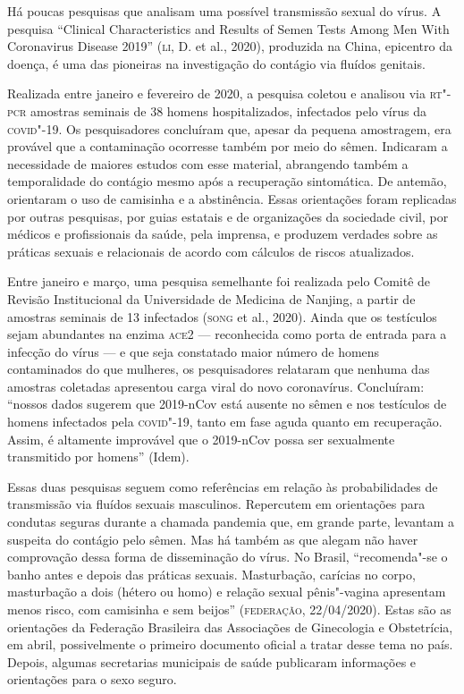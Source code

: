 Há poucas pesquisas que analisam uma possível transmissão sexual do
vírus. A pesquisa ``Clinical Characteristics and Results of Semen Tests
Among Men With Coronavirus Disease 2019'' (\textsc{li}, D. et al., 2020),
produzida na China, epicentro da doença, é uma das pioneiras na
investigação do contágio via fluídos genitais.

Realizada entre janeiro e fevereiro de 2020, a pesquisa coletou e
analisou via \textsc{rt"-pcr} amostras seminais de 38 homens hospitalizados,
infectados pelo vírus da \textsc{covid}"-19. Os pesquisadores concluíram que,
apesar da pequena amostragem, era provável que a contaminação ocorresse
também por meio do sêmen. Indicaram a necessidade de maiores estudos com
esse material, abrangendo também a temporalidade do contágio mesmo após
a recuperação sintomática. De antemão, orientaram o uso de camisinha e a
abstinência. Essas orientações foram replicadas por outras pesquisas,
por guias estatais e de organizações da sociedade civil, por médicos e
profissionais da saúde, pela imprensa, e produzem verdades sobre as
práticas sexuais e relacionais de acordo com cálculos de riscos
atualizados.

Entre janeiro e março, uma pesquisa semelhante foi realizada pelo Comitê
de Revisão Institucional da Universidade de Medicina de Nanjing, a
partir de amostras seminais de 13 infectados (\textsc{song} et al., 2020). Ainda
que os testículos sejam abundantes na enzima \textsc{ace}2 --- reconhecida como
porta de entrada para a infecção do vírus --- e que seja constatado
maior número de homens contaminados do que mulheres, os pesquisadores
relataram que nenhuma das amostras coletadas apresentou carga viral do
novo coronavírus. Concluíram: ``nossos dados sugerem que 2019-nCov está
ausente no sêmen e nos testículos de homens infectados pela \textsc{covid}"-19,
tanto em fase aguda quanto em recuperação. Assim, é altamente improvável
que o 2019-nCov possa ser sexualmente transmitido por homens'' (Idem).

Essas duas pesquisas seguem como referências em relação às
probabilidades de transmissão via fluídos sexuais masculinos. Repercutem
em orientações para condutas seguras durante a chamada pandemia que, em
grande parte, levantam a suspeita do contágio pelo sêmen. Mas há também
as que alegam não haver comprovação dessa forma de disseminação do
vírus. No Brasil, ``recomenda"-se o banho antes e depois das práticas
sexuais. Masturbação, carícias no corpo, masturbação a dois (hétero ou
homo) e relação sexual pênis"-vagina apresentam menos risco, com
camisinha e sem beijos'' (\textsc{federação}, 22/04/2020). Estas são as
orientações da Federação Brasileira das Associações de Ginecologia e
Obstetrícia, em abril, possivelmente o primeiro documento oficial a
tratar desse tema no país. Depois, algumas secretarias municipais de
saúde publicaram informações e orientações para o sexo seguro.

